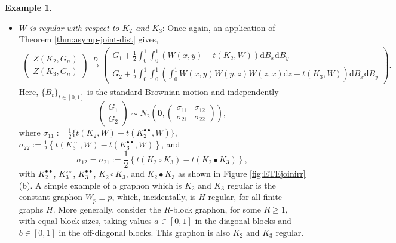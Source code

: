 \documentclass[11pt,reqno]{amsart}
\numberwithin{equation}{section}
\theoremstyle{definition}
\newtheorem{example}{Example}[section]
\begin{document}
\begin{example}
\begin{itemize}
\item[{\it Case} 4:] {\it $W$ is regular with respect to $K_2$ and $K_3$}: Once again, an application of Theorem \ref{thm:asymp-joint-dist} gives, 
        \begin{align*}
            \begin{pmatrix} 
                Z(K_2, G_n) \\ 
                Z(K_3, G_n)
                \end{pmatrix}
                 \stackrel{D} \rightarrow \begin{pmatrix}
                    G_1 + \frac{1}{2} \int_{0}^{1}\int_{0}^{1} \left(W(x,y) - t(K_2,W)\right) \mathrm d B_{x}\mathrm d B_{y}\\
                    G_2 + \frac{1}{2} \int_{0}^{1}\int_{0}^{1} \left(\int_0^1 W(x,y)W(y,z)W(z,x)\mathrm d z - t(K_3,W)\right) \mathrm d B_{x}\mathrm d B_{y}
                \end{pmatrix} .  
        \end{align*}
        Here, $\{B_{t}\}_{t\in [0,1]}$ is the standard Brownian motion and independently 
        $$\begin{pmatrix} 
        G_1 \\ G_2 
        \end{pmatrix} \sim N_2 \left( \bm 0, \begin{pmatrix} 
        \sigma_{11} & \sigma_{12} \\ 
        \sigma_{21} & \sigma_{22} 
        \end{pmatrix} \right) , $$ 
        where $\sigma_{11} := \frac{1}{2}\{t\left(K_2,W\right) - t\left(K_2^{\bullet \bullet},W\right)\}$, $\sigma_{22} := \frac{1}{2}\left\{t\left( K_3^{\circ \circ},W\right) - t\left(K_3^{\bullet \bullet},W\right)\right\}$, and $$\sigma_{12} = \sigma_{21} := \frac{1}{2}\left\{t\left( K_2 \circ K_3 \right) - t\left(K_2 \bullet K_3\right)\right\},$$ 
           with $K_2^{\bullet \bullet}$, $K_3^{\circ \circ}$, $K_3^{\bullet \bullet}$, $K_2 \circ K_3$, and $K_2 \bullet K_3$ as shown in Figure \ref{fig:ETEjoinirr}(b). 
    A simple example of a graphon which is $K_2$ and $K_3$ regular is the constant graphon $W_p \equiv p$, which, incidentally, is $H$-regular, for all finite graphs $H$. More generally, consider the $R$-block graphon, for some $R \geq 1$, with equal block sizes, taking values $a \in [0, 1]$ in the diagonal blocks and $b \in [0, 1]$ in the off-diagonal blocks. This graphon is also $K_2$ and $K_3$ regular. 
    \end{itemize}

\end{example}
\end{document}
